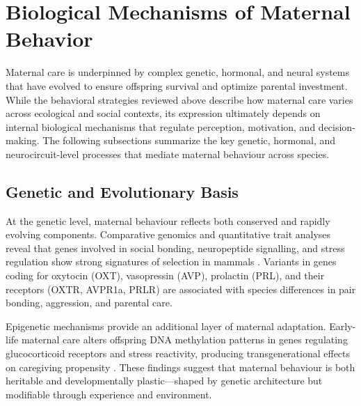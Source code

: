 
    
\section{Biological Mechanisms of Maternal Behavior}
Maternal care is underpinned by complex genetic, hormonal, and neural systems that have evolved to ensure offspring survival and optimize parental investment. While the behavioral strategies reviewed above describe how maternal care varies across ecological and social contexts, its expression ultimately depends on internal biological mechanisms that regulate perception, motivation, and decision-making. The following subsections summarize the key genetic, hormonal, and neurocircuit-level processes that mediate maternal behaviour across species.

    \subsection{Genetic and Evolutionary Basis}
        At the genetic level, maternal behaviour reflects both conserved and rapidly evolving components. Comparative genomics and quantitative trait analyses reveal that genes involved in social bonding, neuropeptide signalling, and stress regulation show strong signatures of selection in mammals \cite{dulac2014, galef2013}. Variants in genes coding for oxytocin (OXT), vasopressin (AVP), prolactin (PRL), and their receptors (OXTR, AVPR1a, PRLR) are associated with species differences in pair bonding, aggression, and parental care.

        Epigenetic mechanisms provide an additional layer of maternal adaptation. Early-life maternal care alters offspring DNA methylation patterns in genes regulating glucocorticoid receptors and stress reactivity, producing transgenerational effects on caregiving propensity \cite{champagne2006, meaney2010}.  These findings suggest that maternal behaviour is both heritable and developmentally plastic—shaped by genetic architecture but modifiable through experience and environment.

